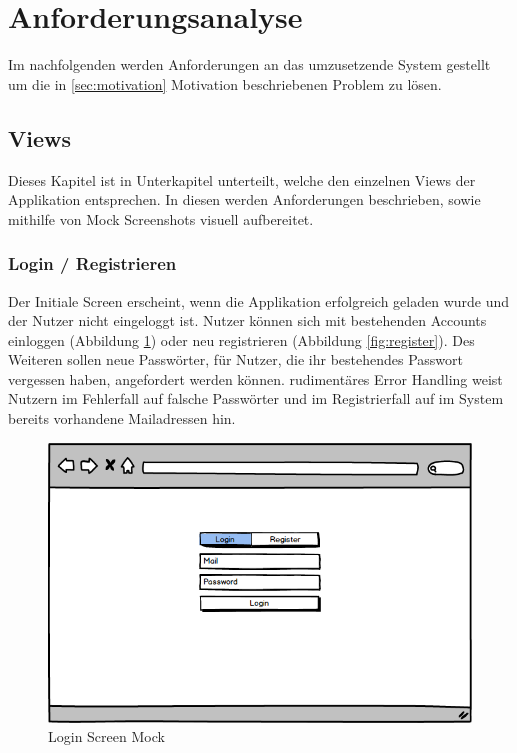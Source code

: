 \section{Anforderungsanalyse}
\label{sec:anforderungsanalyse}

Im nachfolgenden werden Anforderungen an das umzusetzende System gestellt um die in \ref{sec:motivation} Motivation beschriebenen Problem zu lösen.

\subsection{Views}

Dieses Kapitel ist in Unterkapitel unterteilt, welche den einzelnen Views der Applikation \projectname{} entsprechen.
In diesen werden Anforderungen beschrieben, sowie mithilfe von Mock Screenshots visuell aufbereitet.

\subsubsection{Login / Registrieren}

Der Initiale Screen erscheint, wenn die Applikation erfolgreich geladen wurde und der Nutzer nicht eingeloggt ist.
Nutzer können sich mit bestehenden Accounts einloggen (Abbildung \ref{fig:login}) oder neu registrieren (Abbildung \ref{fig:register}).
Des Weiteren sollen neue Passwörter, für Nutzer, die ihr bestehendes Passwort vergessen haben, angefordert werden können.
rudimentäres Error Handling weist Nutzern im Fehlerfall auf falsche Passwörter und im Registrierfall auf
im System bereits vorhandene Mailadressen hin.

\begin{figure}[h]
 \centering
 \includegraphics[width=0.7\linewidth]{kapitel1/mocks/Login.png}
 \caption{Login Screen Mock}
  \label{fig:login}
\end{figure}

